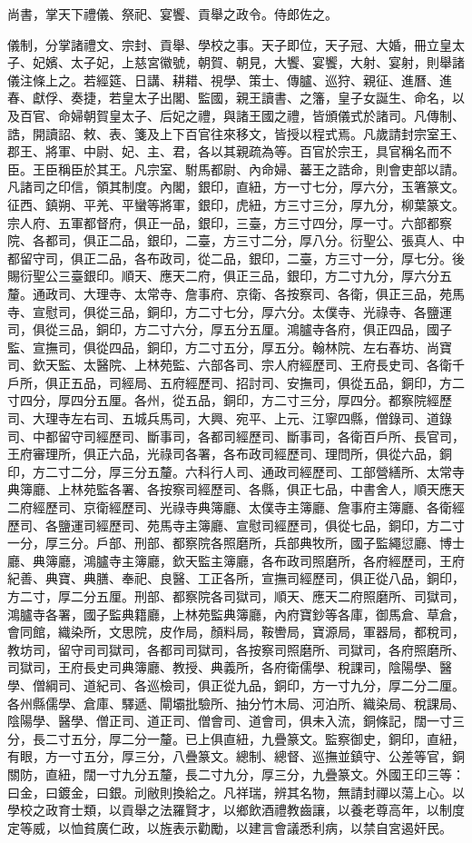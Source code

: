 尚書，掌天下禮儀、祭祀、宴饗、貢舉之政令。侍郎佐之。

儀制，分掌諸禮文、宗封、貢舉、學校之事。天子即位，天子冠、大婚，冊立皇太子、妃嬪、太子妃，上慈宮徽號，朝賀、朝見，大饗、宴饗，大射、宴射，則舉諸儀注條上之。若經筵、日講、耕耤、視學、策士、傳臚、巡狩、親征、進曆、進春、獻俘、奏捷，若皇太子出閣、監國，親王讀書、之籓，皇子女誕生、命名，以及百官、命婦朝賀皇太子、后妃之禮，與諸王國之禮，皆頒儀式於諸司。凡傳制、誥，開讀詔、敕、表、箋及上下百官往來移文，皆授以程式焉。凡歲請封宗室王、郡王、將軍、中尉、妃、主、君，各以其親疏為等。百官於宗王，具官稱名而不臣。王臣稱臣於其王。凡宗室、駙馬都尉、內命婦、蕃王之誥命，則會吏部以請。凡諸司之印信，領其制度。內閣，銀印，直紐，方一寸七分，厚六分，玉箸篆文。征西、鎮朔、平羌、平蠻等將軍，銀印，虎紐，方三寸三分，厚九分，柳葉篆文。宗人府、五軍都督府，俱正一品，銀印，三臺，方三寸四分，厚一寸。六部都察院、各都司，俱正二品，銀印，二臺，方三寸二分，厚八分。衍聖公、張真人、中都留守司，俱正二品，各布政司，從二品，銀印，二臺，方三寸一分，厚七分。後賜衍聖公三臺銀印。順天、應天二府，俱正三品，銀印，方二寸九分，厚六分五釐。通政司、大理寺、太常寺、詹事府、京衛、各按察司、各衛，俱正三品，苑馬寺、宣慰司，俱從三品，銅印，方二寸七分，厚六分。太僕寺、光祿寺、各鹽運司，俱從三品，銅印，方二寸六分，厚五分五厘。鴻臚寺各府，俱正四品，國子監、宣撫司，俱從四品，銅印，方二寸五分，厚五分。翰林院、左右春坊、尚寶司、欽天監、太醫院、上林苑監、六部各司、宗人府經歷司、王府長史司、各衛千戶所，俱正五品，司經局、五府經歷司、招討司、安撫司，俱從五品，銅印，方二寸四分，厚四分五厘。各州，從五品，銅印，方二寸三分，厚四分。都察院經歷司、大理寺左右司、五城兵馬司，大興、宛平、上元、江寧四縣，僧錄司、道錄司、中都留守司經歷司、斷事司，各都司經歷司、斷事司，各衛百戶所、長官司，王府審理所，俱正六品，光祿司各署，各布政司經歷司、理問所，俱從六品，銅印，方二寸二分，厚三分五釐。六科行人司、通政司經歷司、工部營繕所、太常寺典簿廳、上林苑監各署、各按察司經歷司、各縣，俱正七品，中書舍人，順天應天二府經歷司、京衛經歷司、光祿寺典簿廳、太僕寺主簿廳、詹事府主簿廳、各衛經歷司、各鹽運司經歷司、苑馬寺主簿廳、宣慰司經歷司，俱從七品，銅印，方二寸一分，厚三分。戶部、刑部、都察院各照磨所，兵部典牧所，國子監繩愆廳、博士廳、典簿廳，鴻臚寺主簿廳，欽天監主簿廳，各布政司照磨所，各府經歷司，王府紀善、典寶、典膳、奉祀、良醫、工正各所，宣撫司經歷司，俱正從八品，銅印，方二寸，厚二分五厘。刑部、都察院各司獄司，順天、應天二府照磨所、司獄司，鴻臚寺各署，國子監典籍廳，上林苑監典簿廳，內府寶鈔等各庫，御馬倉、草倉，會同館，織染所，文思院，皮作局，顏料局，鞍轡局，寶源局，軍器局，都稅司，教坊司，留守司司獄司，各都司司獄司，各按察司照磨所、司獄司，各府照磨所、司獄司，王府長史司典簿廳、教授、典義所，各府衛儒學、稅課司，陰陽學、醫學、僧綱司、道紀司、各巡檢司，俱正從九品，銅印，方一寸九分，厚二分二厘。各州縣儒學、倉庫、驛遞、閘壩批驗所、抽分竹木局、河泊所、織染局、稅課局、陰陽學、醫學、僧正司、道正司、僧會司、道會司，俱未入流，銅條記，闊一寸三分，長二寸五分，厚二分一釐。已上俱直紐，九疊篆文。監察御史，銅印，直紐，有眼，方一寸五分，厚三分，八疊篆文。總制、總督、巡撫並鎮守、公差等官，銅關防，直紐，闊一寸九分五釐，長二寸九分，厚三分，九疊篆文。外國王印三等：曰金，曰鍍金，曰銀。刓敝則換給之。凡祥瑞，辨其名物，無請封禪以蕩上心。以學校之政育士類，以貢舉之法羅賢才，以鄉飲酒禮教齒讓，以養老尊高年，以制度定等威，以恤貧廣仁政，以旌表示勸勵，以建言會議悉利病，以禁自宮遏奸民。

